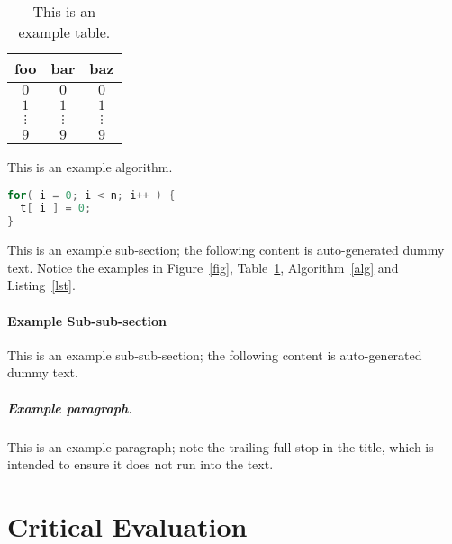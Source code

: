 \documentclass[ %
                    author={Dominic Joseph Moylett},
                supervisor={Dr. Raphael Clifford and Dr. Benjamin Sach},
                    degree={MEng},
                     title={Dictionary Matching with Fingerprints},
                  subtitle={An Empirical Analysis},
                      type={Research},
                      year={2014} ]{dissertation}
\begin{document}
\begin{table}[t]
\centering
\begin{tabular}{|cc|c|}
\hline
foo      & bar      & baz      \\
\hline
$0     $ & $0     $ & $0     $ \\
$1     $ & $1     $ & $1     $ \\
$\vdots$ & $\vdots$ & $\vdots$ \\
$9     $ & $9     $ & $9     $ \\
\hline
\end{tabular}
\caption{This is an example table.}
\label{tab}
\end{table}

\begin{algorithm}[t]
\caption{This is an example algorithm.}
\label{alg}
\end{algorithm}

\begin{lstlisting}[float={t},caption={This is an example listing.},label={lst},language=C]
for( i = 0; i < n; i++ ) {
  t[ i ] = 0;
}
\end{lstlisting}

This is an example sub-section;
the following content is auto-generated dummy text.
Notice the examples in Figure~\ref{fig}, Table~\ref{tab}, Algorithm~\ref{alg}
and Listing~\ref{lst}.
\lipsum

\subsubsection{Example Sub-sub-section}

This is an example sub-sub-section;
the following content is auto-generated dummy text.
\lipsum

\paragraph{Example paragraph.}

This is an example paragraph; note the trailing full-stop in the title,
which is intended to ensure it does not run into the text.


\chapter{Critical Evaluation}
\label{chap:evaluation}
\end{document}
